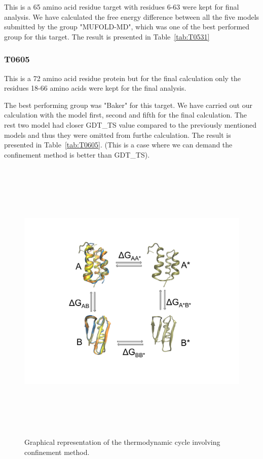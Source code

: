 \documentclass[12pt]{article}
\begin{document}
This is a 65 amino acid residue target with residues 6-63 were kept for final analysis. We have
calculated the free energy difference between all the five models submitted by the group
"MUFOLD-MD", which was one of the best performed group for this target.  The result is presented in
Table~\protect\ref{tab:T0531}



\subsubsection{T0605}

This is a 72 amino acid residue protein but for the final calculation only the residues 18-66 amino acids were kept for the final analysis.

The best performing group was "Baker" for this target. We have carried out our calculation with the model first, second and fifth for the
final calculation. The rest two model had closer GDT\_TS value compared to the previously mentioned models and thus they were omitted from
furthe calculation. The result is presented in Table~\protect\ref{tab:T0605}. (This is a case where we can demand the confinement
method is better than GDT\_TS).


\begin{figure}
\begin{center}
\includegraphics[width=14cm,height=14cm]{method.pdf}
\end{center}
\caption{Graphical representation of the thermodynamic cycle involving confinement method.}
\label{fig:method}
\end{figure}
\end{document}
